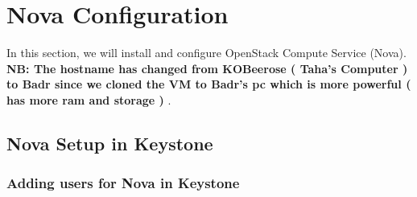 \chapter{Nova Configuration}
\par In this section, we will install and configure OpenStack Compute Service (Nova).
\\

\textbf{NB: The hostname has changed from KOBeerose ( Taha's Computer ) to Badr since we cloned the VM to Badr's pc which is more powerful ( has more ram and storage ) }.
\begin{spacing}{1.2}
\section{Nova Setup in Keystone}
\subsection{Adding users for Nova in Keystone}


\end{spacing}
